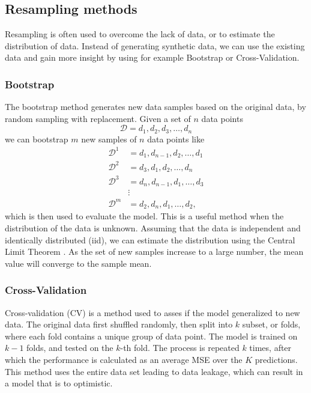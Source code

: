 \subsection{Resampling methods}\label{ssec:resampling_methods}
Resampling is often used to overcome the lack of data, or to estimate the distribution of data. Instead of generating synthetic data, we can use the existing data and gain more insight by using for example Bootstrap or Cross-Validation.

\subsubsection{Bootstrap}\label{sssec:bootstrap}
The bootstrap method generates new data samples based on the original data, by random sampling with replacement. Given a set of $n$ data points
\begin{equation*}
    \mathcal{D} = {d_{1}, d_{2}, d_{3}, \dots, d_{n}}
\end{equation*}
we can bootstrap $m$ new samples of $n$ data points like
\begin{align*}
    \mathcal{D}^{1} &= {d_{1}, d_{n-1}, d_{2}, \dots, d_{1}} \\
    \mathcal{D}^{2} &= {d_{3}, d_{1}, d_{2}, \dots, d_{n}} \\
    \mathcal{D}^{3} &= {d_{n}, d_{n-1}, d_{1}, \dots, d_{3}} \\
    &\vdots \\
    \mathcal{D}^{m} &= {d_{2}, d_{n}, d_{1}, \dots, d_{2}},
\end{align*}
which is then used to evaluate the model. This is a useful method when the distribution of the data is unknown. Assuming that the data is independent and identically distributed (iid), we can estimate the distribution using the Central Limit Theorem \cite{britannica:2024:central_limit_theorem}. As the set of new samples increase to a large number, the mean value will converge to the sample mean.


\subsubsection{Cross-Validation}\label{sssec:cross_validation}
Cross-validation (CV) is a method used to asses if the model generalized to new data. The original data first shuffled randomly, then split into $k$ subset, or folds, where each fold contains a unique group of data point. The model is trained on $k-1$ folds, and tested on the $k$-th fold. The process is repeated $k$ times, after which the performance is calculated as an average MSE over the $K$ predictions. This method uses the entire data set leading to data leakage, which can result in a model that is to optimistic.


